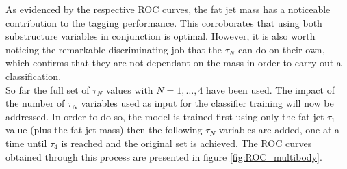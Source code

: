 \documentclass[main]{subfiles} %
\begin{document}
As evidenced by the respective ROC curves, the fat jet mass has a noticeable contribution to the tagging performance. This corroborates that using both substructure variables in conjunction is optimal. However, it is also worth noticing the remarkable discriminating job that the $\tau_N$ can do on their own, which confirms that they are not dependant on the mass in order to carry out a classification. \\

So far the full set of $\tau_N$ values with $N = 1,\dots,4$ have been used. The impact of the number of $\tau_N$ variables used as input for the classifier training will now be addressed. In order to do so, the model is trained first using only the fat jet $\tau_1$ value (plus the fat jet mass) then the following $\tau_N$ variables are added, one at a time until $\tau_4$ is reached and the original set is achieved. The ROC curves obtained through this process are presented in figure \ref{fig:ROC_multibody}. \\
\end{document}
